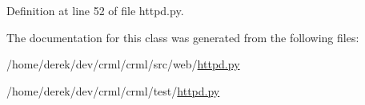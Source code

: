 Definition at line 52 of file httpd.py.



The documentation for this class was generated from the following files:\begin{DoxyCompactItemize}
\item 
/home/derek/dev/crml/crml/src/web/\hyperlink{src_2web_2httpd_8py}{httpd.py}\item 
/home/derek/dev/crml/crml/test/\hyperlink{test_2httpd_8py}{httpd.py}\end{DoxyCompactItemize}

